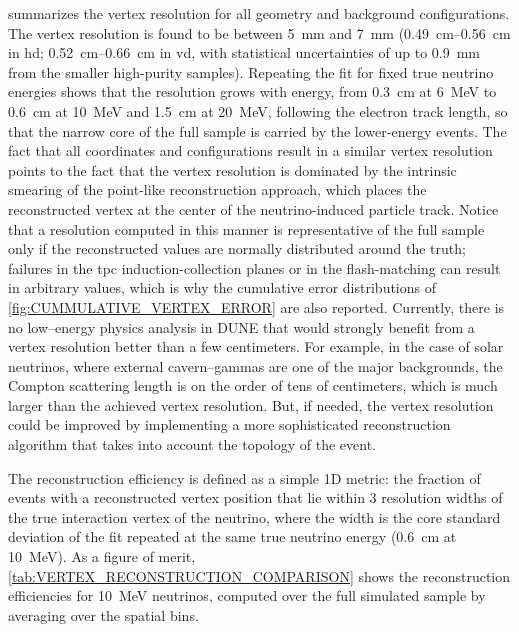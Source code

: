 summarizes the vertex resolution for all geometry and background configurations. The vertex resolution is found to be between \SI{5}{\milli\meter} and \SI{7}{\milli\meter} (\SIrange{0.49}{0.56}{\centi\meter} in \gls{hd}; \SIrange{0.52}{0.66}{\centi\meter} in \gls{vd}, with statistical uncertainties of up to \SI{0.9}{\milli\meter} from the smaller high-purity samples). Repeating the fit for fixed true neutrino energies shows that the resolution grows with energy, from \SI{0.3}{\centi\meter} at \SI{6}{\mega\electronvolt} to \SI{0.6}{\centi\meter} at \SI{10}{\mega\electronvolt} and \SI{1.5}{\centi\meter} at \SI{20}{\mega\electronvolt}, following the electron track length, so that the narrow core of the full sample is carried by the lower-energy events. The fact that all coordinates and configurations result in a similar vertex resolution points to the fact that the vertex resolution is dominated by the intrinsic smearing of the point-like reconstruction approach, which places the reconstructed vertex at the center of the neutrino-induced particle track. Notice that a resolution computed in this manner is representative of the full sample only if the reconstructed values are normally distributed around the truth; failures in the \gls{tpc} induction-collection planes or in the flash-matching can result in arbitrary values, which is why the cumulative error distributions of \cref{fig:CUMMULATIVE_VERTEX_ERROR} are also reported. Currently, there is no low--energy physics analysis in DUNE that would strongly benefit from a vertex resolution better than a few centimeters. For example, in the case of solar neutrinos, where external cavern--gammas are one of the major backgrounds, the Compton scattering length is on the order of tens of centimeters, which is much larger than the achieved vertex resolution. But, if needed, the vertex resolution could be improved by implementing a more sophisticated reconstruction algorithm that takes into account the topology of the event.

The reconstruction efficiency is defined as a simple 1D metric: the fraction of events with a reconstructed vertex position that lie within 3 resolution widths of the true interaction vertex of the neutrino, where the width is the core standard deviation of the fit repeated at the same true neutrino energy (\SI{0.6}{\centi\meter} at \SI{10}{\mega\electronvolt}). As a figure of merit, \cref{tab:VERTEX_RECONSTRUCTION_COMPARISON} shows the reconstruction efficiencies for \SI{10}{\mega\electronvolt} neutrinos, computed over the full simulated sample by averaging over the spatial bins.

